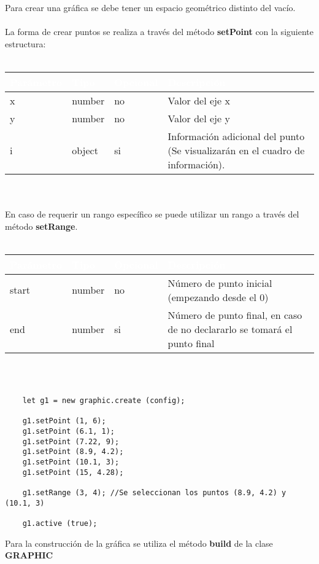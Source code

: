 \documentclass[10pt]{article}
\begin{document}
Para crear una gráfica se debe tener un espacio geométrico distinto del vacío.
\\\\
La forma de crear puntos se realiza a través del método \textbf{setPoint} con la siguiente estructura:
\\\\
\begin{tabular}{|m{2.2cm}|m{1.5cm}|m{1.5cm}|m{10cm}|}
	\hline
	\rowcolor{black}\textcolor{white}{Parámetro} & \textcolor{white}{Tipo} & \textcolor{white}{Opcional} & \textcolor{white}{Descripción} \\
	\hline
	x & number & no & Valor del eje x \\
	\hline
	y & number & no & Valor del eje y \\
	\hline
	i & object & si & Información adicional del punto (Se visualizarán en el cuadro de información). \\
	\hline
\end{tabular}
\noindent
\\\\
En caso de requerir un rango específico se puede utilizar un rango a través del método \textbf{setRange}.
\\\\
\begin{tabular}{|m{2.2cm}|m{1.5cm}|m{1.5cm}|m{10cm}|}
	\hline
	\rowcolor{black}\textcolor{white}{Parámetro} & \textcolor{white}{Tipo} & \textcolor{white}{Opcional} & \textcolor{white}{Descripción} \\
	\hline
	start & number & no & Número de punto inicial (empezando desde el 0) \\
	\hline
	end & number & si & Número de punto final, en caso de no declararlo se tomará el punto final \\
	\hline
\end{tabular}
\\\\
\begin{lstlisting}
	let g1 = new graphic.create (config);
	
	g1.setPoint (1, 6);
	g1.setPoint (6.1, 1);
	g1.setPoint (7.22, 9);
	g1.setPoint (8.9, 4.2);
	g1.setPoint (10.1, 3);
	g1.setPoint (15, 4.28);
	
	g1.setRange (3, 4); //Se seleccionan los puntos (8.9, 4.2) y (10.1, 3)
	
	g1.active (true);
\end{lstlisting}
\noindent
Para la construcción de la gráfica se utiliza el método \textbf{build} de la clase \textbf{GRAPHIC}
\end{document}
